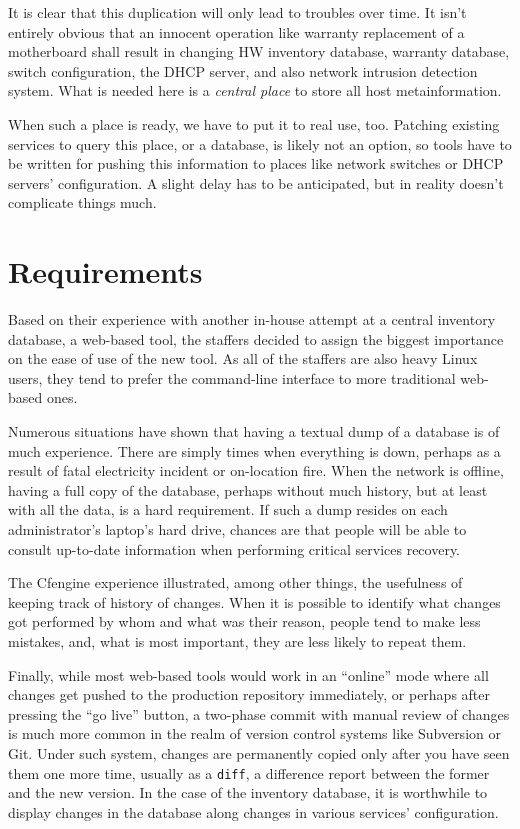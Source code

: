 \documentclass[11pt]{article}
\begin{document}
It is clear that this duplication will only lead to troubles over time.  It
isn't entirely obvious that an innocent operation like warranty replacement of a
motherboard shall result in changing HW inventory database, warranty database,
switch configuration, the DHCP server, and also network intrusion detection
system.  What is needed here is a {\em central place} to store all host
metainformation.

When such a place is ready, we have to put it to real use, too.  Patching
existing services to query this place, or a database, is likely not an option,
so tools have to be written for pushing this information to places like network
switches or DHCP servers' configuration.  A slight delay has to be anticipated,
but in reality doesn't complicate things much.

\section{Requirements}

Based on their experience with another in-house attempt at a central inventory
database, a web-based tool, the staffers decided to assign the biggest
importance on the ease of use of the new tool.  As all of the staffers are also
heavy Linux users, they tend to prefer the command-line interface to more
traditional web-based ones.

Numerous situations have shown that having a textual dump of a database is of
much experience.  There are simply times when everything is down, perhaps as a
result of fatal electricity incident or on-location fire.  When the network is
offline, having a full copy of the database, perhaps without much history, but
at least with all the data, is a hard requirement.  If such a dump resides on
each administrator's laptop's hard drive, chances are that people will be able
to consult up-to-date information when performing critical services recovery.

The Cfengine experience illustrated, among other things, the usefulness of
keeping track of history of changes.  When it is possible to identify what
changes got performed by whom and what was their reason, people tend to make
less mistakes, and, what is most important, they are less likely to repeat them.

Finally, while most web-based tools would work in an ``online'' mode where all
changes get pushed to the production repository immediately, or perhaps after
pressing the ``go live'' button, a two-phase commit with manual review of
changes is much more common in the realm of version control systems like
Subversion or Git.  Under such system, changes are permanently copied only after
you have seen them one more time, usually as a {\tt diff}, a difference report
between the former and the new version.  In the case of the inventory database,
it is worthwhile to display changes in the database along changes in various
services' configuration.
\end{document}
